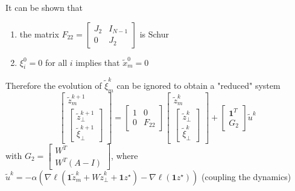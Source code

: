 \documentclass{book}
\newcommand{\fatone}{\boldsymbol{1}}
\newcommand{\fatl}{\boldsymbol{\ell}}
\theoremstyle{theoremv2}
\theoremstyle{defv2}
\theoremstyle{remark}
\theoremstyle{remark}
\theoremstyle{definition}
\theoremstyle{definition}
\begin{document}
It can be shown that 
\begin{enumerate}
    \item the matrix $F_{22} = \begin{bmatrix}
            J_2 & I_{N-1} \\ 0 & J_2
    \end{bmatrix}$ is Schur
\item $\xi_i^0 = 0$ for all $i$ implies that $\tilde{x}^0_m=0$
\end{enumerate}
Therefore the evolution of $\tilde{\xi}_m^k$ can be ignored to obtain a "reduced" system
\[
    \begin{bmatrix}
         \tilde{z}^{k+1}_m \\ \begin{bmatrix}
             \tilde{z}^{k+1}_\perp \\ \tilde{\xi}^{k+1}_\perp 
         \end{bmatrix}
    \end{bmatrix} = \begin{bmatrix}
        1 & 0 \\ 0 & F_{22}
    \end{bmatrix} \begin{bmatrix}
         \tilde{z}^{k}_m \\ \begin{bmatrix}
             \tilde{z}^{k}_\perp \\ \tilde{\xi}^{k}_\perp 
         \end{bmatrix}
    \end{bmatrix} + \begin{bmatrix}
        \fatone^T \\ G_2
    \end{bmatrix} \tilde{u}^k
\]
with $G_2 = \begin{bmatrix}
    W^T \\ W^T(A-I)
\end{bmatrix}$, where $\tilde{u}^k = -\alpha(\nabla\fatl(\fatone \tilde{z}^k_m + W \tilde{z}^k_\perp + \fatone z^\star)-\nabla\fatl(\fatone z^\star))$ (coupling the dynamics)
\end{document}
